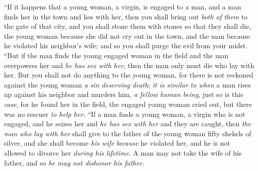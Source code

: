 \begin{biblechapter}
\verse “If it happens that a young woman, a virgin, is engaged to a man, and a man finds her in the town and lies with her,
\verse then you shall bring out \textit{both of them} to the gate of that city, and you shall stone them with stones so that they shall die, the young woman because she did not cry out in the town, and the man because he violated his neighbor’s wife; and so you shall purge the evil from your midst.
\verse “But if the man finds the young engaged woman in the field and the man overpowers her and \textit{he has sex with her}, then the man only must die who lay with her.
\verse But you shall not do anything to the young woman, for there is not reckoned against the young woman \textit{a sin deserving death}; \textit{it is similar to when} a man rises up against his neighbor and murders him, \textit{a fellow human being}, just so is this \textit{case},
\verse for he found her in the field, the engaged young woman cried out, but there was no rescuer \textit{to help her}.
\verse “If a man finds a young woman, a virgin who is not engaged, and he seizes her and \textit{he has sex with her} and they are caught,
\verse then \textit{the man who lay with her} shall give to the father of the young woman fifty shekels of silver, and she shall become \textit{his wife} \textit{because} he violated her, and he is not allowed to divorce her \textit{during his lifetime}.
\verse {} A man may not take the wife of his father, and so \textit{he may not dishonor his father}.
\end{biblechapter}


